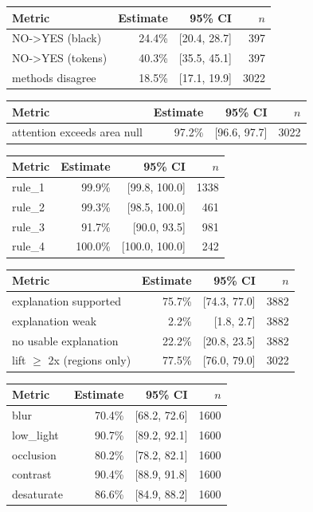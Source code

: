 \begin{tabular}{lrrr}
\toprule
Metric & Estimate & 95\% CI & $n$ \\
\midrule
NO->YES (black) & 24.4\% & [20.4, 28.7] & 397 \\
NO->YES (tokens) & 40.3\% & [35.5, 45.1] & 397 \\
methods disagree & 18.5\% & [17.1, 19.9] & 3022 \\
\bottomrule
\end{tabular}

\begin{tabular}{lrrr}
\toprule
Metric & Estimate & 95\% CI & $n$ \\
\midrule
attention exceeds area null & 97.2\% & [96.6, 97.7] & 3022 \\
\bottomrule
\end{tabular}

\begin{tabular}{lrrr}
\toprule
Metric & Estimate & 95\% CI & $n$ \\
\midrule
rule\_1 & 99.9\% & [99.8, 100.0] & 1338 \\
rule\_2 & 99.3\% & [98.5, 100.0] & 461 \\
rule\_3 & 91.7\% & [90.0, 93.5] & 981 \\
rule\_4 & 100.0\% & [100.0, 100.0] & 242 \\
\bottomrule
\end{tabular}

\begin{tabular}{lrrr}
\toprule
Metric & Estimate & 95\% CI & $n$ \\
\midrule
explanation supported & 75.7\% & [74.3, 77.0] & 3882 \\
explanation weak & 2.2\% & [1.8, 2.7] & 3882 \\
no usable explanation & 22.2\% & [20.8, 23.5] & 3882 \\
lift $\geq$ 2x (regions only) & 77.5\% & [76.0, 79.0] & 3022 \\
\bottomrule
\end{tabular}

\begin{tabular}{lrrr}
\toprule
Metric & Estimate & 95\% CI & $n$ \\
\midrule
blur & 70.4\% & [68.2, 72.6] & 1600 \\
low\_light & 90.7\% & [89.2, 92.1] & 1600 \\
occlusion & 80.2\% & [78.2, 82.1] & 1600 \\
contrast & 90.4\% & [88.9, 91.8] & 1600 \\
desaturate & 86.6\% & [84.9, 88.2] & 1600 \\
\bottomrule
\end{tabular}

